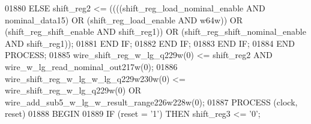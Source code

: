 \begin{DoxyCode}
{01880                 \textcolor{keywordflow}{ELSE} \textcolor{vhdlchar}{shift_reg2} \textcolor{vhdlchar}{<=} \textcolor{vhdlchar}{(}\textcolor{vhdlchar}{(}\textcolor{vhdlchar}{(}\textcolor{vhdlchar}{(}\textcolor{vhdlchar}{shift_reg_load_nominal_enable} \textcolor{keywordflow}{AND} \textcolor{vhdlchar}{
      nominal_data15}\textcolor{vhdlchar}{)} \textcolor{keywordflow}{OR} \textcolor{vhdlchar}{(}\textcolor{vhdlchar}{shift_reg_load_enable} \textcolor{keywordflow}{AND} \textcolor{vhdlchar}{w64w}\textcolor{vhdlchar}{)}\textcolor{vhdlchar}{)} \textcolor{keywordflow}{OR} \textcolor{vhdlchar}{(}\textcolor{vhdlchar}{shift_reg_shift_enable} \textcolor{keywordflow}{AND} \textcolor{vhdlchar}{
      shift_reg1}\textcolor{vhdlchar}{)}\textcolor{vhdlchar}{)} \textcolor{keywordflow}{OR} \textcolor{vhdlchar}{(}\textcolor{vhdlchar}{shift_reg_shift_nominal_enable} \textcolor{keywordflow}{AND} \textcolor{vhdlchar}{shift_reg1}\textcolor{vhdlchar}{)}\textcolor{vhdlchar}{)};
01881                 \textcolor{keywordflow}{END} \textcolor{keywordflow}{IF};
01882             \textcolor{keywordflow}{END} \textcolor{keywordflow}{IF};
01883         \textcolor{keywordflow}{END} \textcolor{keywordflow}{IF};
01884     \textcolor{keywordflow}{END} \textcolor{keywordflow}{PROCESS};
01885     \textcolor{vhdlchar}{wire_shift_reg_w_lg_q229w}\textcolor{vhdlchar}{(}\textcolor{vhdllogic}{}\textcolor{vhdllogic}{0}\textcolor{vhdlchar}{)} \textcolor{vhdlchar}{<=} \textcolor{vhdlchar}{shift_reg2} \textcolor{keywordflow}{AND} \textcolor{vhdlchar}{
      wire_w_lg_read_nominal_out217w}\textcolor{vhdlchar}{(}\textcolor{vhdllogic}{}\textcolor{vhdllogic}{0}\textcolor{vhdlchar}{)};
01886     \textcolor{vhdlchar}{wire_shift_reg_w_lg_w_lg_q229w230w}\textcolor{vhdlchar}{(}\textcolor{vhdllogic}{}\textcolor{vhdllogic}{0}\textcolor{vhdlchar}{)} \textcolor{vhdlchar}{<=} \textcolor{vhdlchar}{wire_shift_reg_w_lg_q229w}\textcolor{vhdlchar}{(}\textcolor{vhdllogic}{}\textcolor{vhdllogic}{0}\textcolor{vhdlchar}{)} \textcolor{keywordflow}{OR} \textcolor{vhdlchar}{
      wire_add_sub5_w_lg_w_result_range226w228w}\textcolor{vhdlchar}{(}\textcolor{vhdllogic}{}\textcolor{vhdllogic}{0}\textcolor{vhdlchar}{)};
01887     \textcolor{keywordflow}{PROCESS} (clock, reset)
01888 \textcolor{vhdlkeyword}{    BEGIN}
01889         \textcolor{keywordflow}{IF} \textcolor{vhdlchar}{(}\textcolor{vhdlchar}{reset} \textcolor{vhdlchar}{=} \textcolor{vhdlchar}{'}\textcolor{vhdllogic}{}\textcolor{vhdllogic}{1}\textcolor{vhdlchar}{'}\textcolor{vhdlchar}{)} \textcolor{keywordflow}{THEN} \textcolor{vhdlchar}{shift_reg3} \textcolor{vhdlchar}{<=} \textcolor{vhdlchar}{'}\textcolor{vhdllogic}{}\textcolor{vhdllogic}{0}\textcolor{vhdlchar}{'};
}
\end{DoxyCode}
